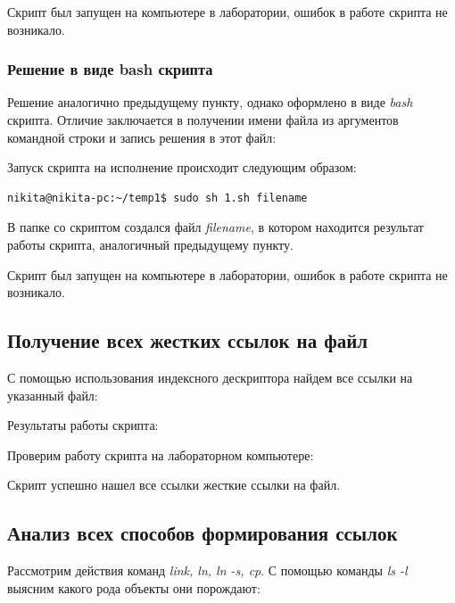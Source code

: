 \documentclass[14pt,a4paper,report]{report}
\begin{document}
Скрипт был запущен на компьютере в лаборатории, ошибок в работе скрипта не возникало.

\subsubsection{Решение в виде bash скрипта}

Решение аналогично предыдущему пункту, однако оформлено в виде \emph{bash} скрипта. Отличие заключается в получении имени файла из аргументов командной строки и запись решения в этот файл:



Запуск скрипта на исполнение происходит следующим образом:

\begin{verbatim}
nikita@nikita-pc:~/temp1$ sudo sh 1.sh filename
\end{verbatim}

В папке со скриптом создался файл \emph{filename}, в котором находится результат работы скрипта, аналогичный предыдущему пункту. 

Скрипт был запущен на компьютере в лаборатории, ошибок в работе скрипта не возникало.

\subsection{Получение всех жестких ссылок на файл}

С помощью использования индексного дескриптора найдем все ссылки на указанный файл:



Результаты работы скрипта:



Проверим работу скрипта на лабораторном компьютере:



Скрипт успешно нашел все ссылки жесткие ссылки на файл.

\subsection{Анализ всех способов формирования ссылок}

Рассмотрим действия команд \emph{link, ln, ln -s, cp}. С помощью команды \emph{ls -l} выясним какого рода объекты они порождают:


\end{document}
